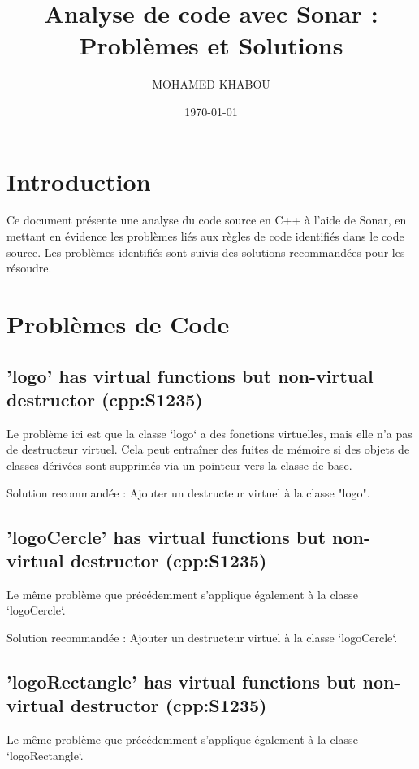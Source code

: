 \documentclass{article}
\begin{document}
\title{Analyse de code avec Sonar : Problèmes et Solutions}
\author{MOHAMED KHABOU}
\date{\today}

\maketitle

\section{Introduction}

Ce document présente une analyse du code source en C++ à l'aide de Sonar, en mettant en évidence les problèmes liés aux règles de code identifiés dans le code source. Les problèmes identifiés sont suivis des solutions recommandées pour les résoudre.

\section{Problèmes de Code}

\subsection{'logo' has virtual functions but non-virtual destructor (cpp:S1235)}

Le problème ici est que la classe `logo` a des fonctions virtuelles, mais elle n'a pas de destructeur virtuel. Cela peut entraîner des fuites de mémoire si des objets de classes dérivées sont supprimés via un pointeur vers la classe de base.

Solution recommandée : Ajouter un destructeur virtuel à la classe "logo".

\subsection{'logoCercle' has virtual functions but non-virtual destructor (cpp:S1235)}

Le même problème que précédemment s'applique également à la classe `logoCercle`.

Solution recommandée : Ajouter un destructeur virtuel à la classe `logoCercle`.

\subsection{'logoRectangle' has virtual functions but non-virtual destructor (cpp:S1235)}

Le même problème que précédemment s'applique également à la classe `logoRectangle`.
\end{document}
